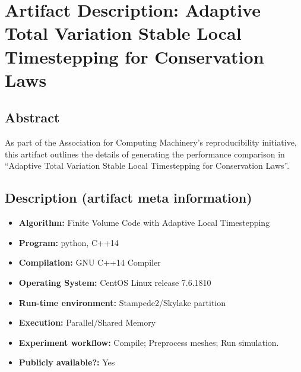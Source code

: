 

\appendix\section{Artifact Description: Adaptive Total Variation Stable Local Timestepping for Conservation Laws}
\label{sec:artifact}

\subsection{Abstract}

As part of the Association for Computing Machinery's reproducibility initiative, this artifact outlines the details of generating the performance comparison in ``Adaptive Total Variation Stable Local Timestepping for Conservation Laws''.

\subsection{Description (artifact meta information)}
{\small
\begin{itemize}
  \item {\bf Algorithm: } Finite Volume Code with Adaptive Local Timestepping
  \item {\bf Program: } python, C++14
  \item {\bf Compilation: } GNU C++14 Compiler
  \item {\bf Operating System: } CentOS Linux release 7.6.1810
  \item {\bf Run-time environment: } Stampede2/Skylake partition
  \item {\bf Execution: } Parallel/Shared Memory
  \item {\bf Experiment workflow: } Compile; Preprocess meshes; Run simulation.
  \item {\bf Publicly available?: } Yes
\end{itemize}
}

